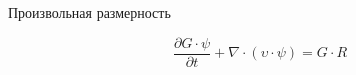 \begin{frame}{Произвольная размерность}

\[ \frac{\partial G\cdot\psi}{\partial t} + \nabla \cdot (\upsilon \cdot \psi) = G \cdot R \]



\end{frame}

